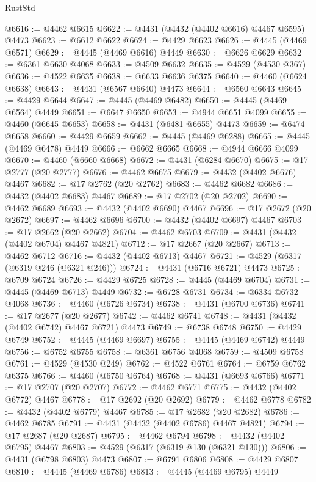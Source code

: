 \begin{lexlean}{RustStd}
\begin{coremodule}
@6616 := @4462 @6615
@6622 := @4431 (@4432 (@4402 @6616) @4467 @6595) @4473
@6623 := @6612 @6622
@6624 := @4429 @6623
@6626 := @4445 (@4469 @6571)
@6629 := @4445 (@4469 @6616) @4449
@6630 := @6626 @6629
@6632 := @6361 @6630 @4068
@6633 := @4509 @6632
@6635 := @4529 (@4530 @367)
@6636 := @4522 @6635
@6638 := @6633 @6636 @6375
@6640 := @4460 (@6624 @6638)
@6643 := @4431 (@6567 @6640) @4473
@6644 := @6560 @6643
@6645 := @4429 @6644
@6647 := @4445 (@4469 @6482)
@6650 := @4445 (@4469 @6564) @4449
@6651 := @6647 @6650
@6653 := @4944 @6651 @4099
@6655 := @4460 (@6645 @6653)
@6658 := @4431 (@6481 @6655) @4473
@6659 := @6474 @6658
@6660 := @4429 @6659
@6662 := @4445 (@4469 @6288)
@6665 := @4445 (@4469 @6478) @4449
@6666 := @6662 @6665
@6668 := @4944 @6666 @4099
@6670 := @4460 (@6660 @6668)
@6672 := @4431 (@6284 @6670)
@6675 := @17 @2777 (@20 @2777)
@6676 := @4462 @6675
@6679 := @4432 (@4402 @6676) @4467
@6682 := @17 @2762 (@20 @2762)
@6683 := @4462 @6682
@6686 := @4432 (@4402 @6683) @4467
@6689 := @17 @2702 (@20 @2702)
@6690 := @4462 @6689
@6693 := @4432 (@4402 @6690) @4467
@6696 := @17 @2672 (@20 @2672)
@6697 := @4462 @6696
@6700 := @4432 (@4402 @6697) @4467
@6703 := @17 @2662 (@20 @2662)
@6704 := @4462 @6703
@6709 := @4431 (@4432 (@4402 @6704) @4467 @4821)
@6712 := @17 @2667 (@20 @2667)
@6713 := @4462 @6712
@6716 := @4432 (@4402 @6713) @4467
@6721 := @4529 (@6317 (@6319 @246 (@6321 @246)))
@6724 := @4431 (@6716 @6721) @4473
@6725 := @6709 @6724
@6726 := @4429 @6725
@6728 := @4445 (@4469 @6704)
@6731 := @4445 (@4469 @6713) @4449
@6732 := @6728 @6731
@6734 := @6334 @6732 @4068
@6736 := @4460 (@6726 @6734)
@6738 := @4431 (@6700 @6736)
@6741 := @17 @2677 (@20 @2677)
@6742 := @4462 @6741
@6748 := @4431 (@4432 (@4402 @6742) @4467 @6721) @4473
@6749 := @6738 @6748
@6750 := @4429 @6749
@6752 := @4445 (@4469 @6697)
@6755 := @4445 (@4469 @6742) @4449
@6756 := @6752 @6755
@6758 := @6361 @6756 @4068
@6759 := @4509 @6758
@6761 := @4529 (@4530 @249)
@6762 := @4522 @6761
@6764 := @6759 @6762 @6375
@6766 := @4460 (@6750 @6764)
@6768 := @4431 (@6693 @6766)
@6771 := @17 @2707 (@20 @2707)
@6772 := @4462 @6771
@6775 := @4432 (@4402 @6772) @4467
@6778 := @17 @2692 (@20 @2692)
@6779 := @4462 @6778
@6782 := @4432 (@4402 @6779) @4467
@6785 := @17 @2682 (@20 @2682)
@6786 := @4462 @6785
@6791 := @4431 (@4432 (@4402 @6786) @4467 @4821)
@6794 := @17 @2687 (@20 @2687)
@6795 := @4462 @6794
@6798 := @4432 (@4402 @6795) @4467
@6803 := @4529 (@6317 (@6319 @130 (@6321 @130)))
@6806 := @4431 (@6798 @6803) @4473
@6807 := @6791 @6806
@6808 := @4429 @6807
@6810 := @4445 (@4469 @6786)
@6813 := @4445 (@4469 @6795) @4449

\end{coremodule}
\end{lexlean}
